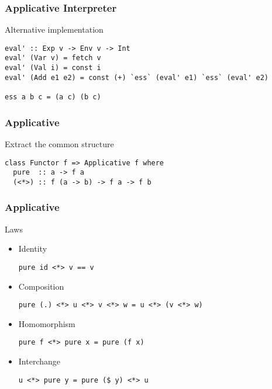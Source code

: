\documentclass{beamer}
\begin{document}
\begin{frame}[fragile]
  \frametitle{Applicative Interpreter}
  \begin{alertblock}{Alternative implementation}
\begin{lstlisting}
eval' :: Exp v -> Env v -> Int
eval' (Var v) = fetch v
eval' (Val i) = const i
eval' (Add e1 e2) = const (+) `ess` (eval' e1) `ess` (eval' e2)

ess a b c = (a c) (b c)
\end{lstlisting} 
\end{alertblock}
\end{frame}

\begin{frame}[fragile]
  \frametitle{Applicative}
\begin{exampleblock}{Extract the common structure}
\begin{lstlisting}
class Functor f => Applicative f where
  pure  :: a -> f a
  (<*>) :: f (a -> b) -> f a -> f b
\end{lstlisting} 
\end{exampleblock}
\end{frame}            

\begin{frame}[fragile]
  \frametitle{Applicative}
  \begin{block}{Laws}
  \begin{itemize}       
  \item Identity
\begin{lstlisting}
pure id <*> v == v
\end{lstlisting}
  \item Composition
\begin{lstlisting}
pure (.) <*> u <*> v <*> w = u <*> (v <*> w)
\end{lstlisting}
  \item Homomorphism
\begin{lstlisting}
pure f <*> pure x = pure (f x)
\end{lstlisting}
  \item Interchange
\begin{lstlisting}
u <*> pure y = pure ($ y) <*> u
\end{lstlisting}
  \end{itemize} 
  \end{block}   
\end{frame}
\end{document}
